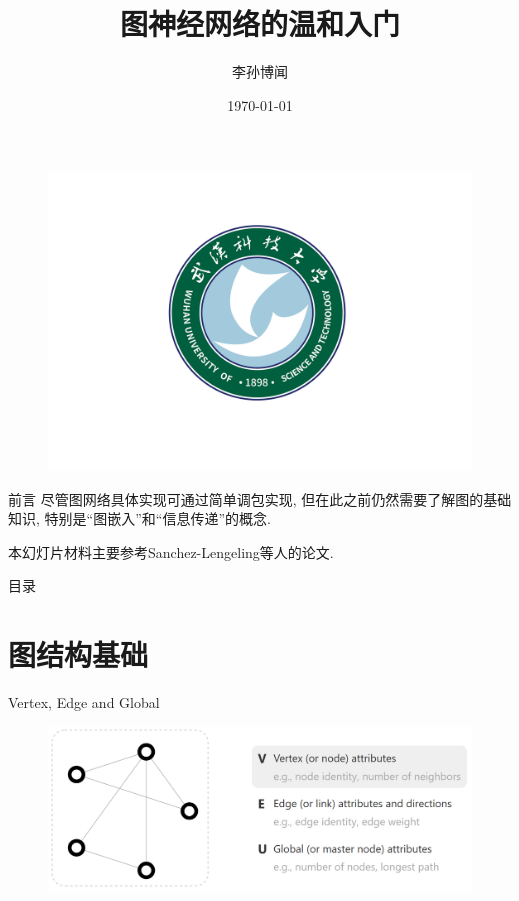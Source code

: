 \documentclass{beamer}
\author[Sunbowen Lee]{李孙博闻}
\title[Graph neural network]{图神经网络的温和入门}
\institute{武汉科技大学 \\ 理学院 \\ 冶金工业过程系统科学湖北省重点实验室}
\date{\today}
\begin{document}
\songti %
\setsansfont{Times New Roman} %

\begin{frame}  %
    \titlepage
    \begin{figure}[htpb]
        \centering
        \vspace{-0.7cm}
        \includegraphics[width=0.45\linewidth]{wust.png}
    \end{figure}
\end{frame}

\begin{frame}{前言}
    尽管图网络具体实现可通过简单调包实现, 但在此之前仍然需要了解图的基础知识, 特别是``图嵌入''和``信息传递''的概念. \newline

    本幻灯片材料主要参考Sanchez-Lengeling\cite{sanchez-lengeling2021a}等人的论文.
\end{frame}

\begin{frame}{目录}
    \tableofcontents
\end{frame}


\section{图结构基础}


\begin{frame}{Vertex, Edge and Global}
    \begin{figure}
        \includegraphics[width=\textwidth]{vertex.png}
    \end{figure}
\end{frame}
\end{document}
